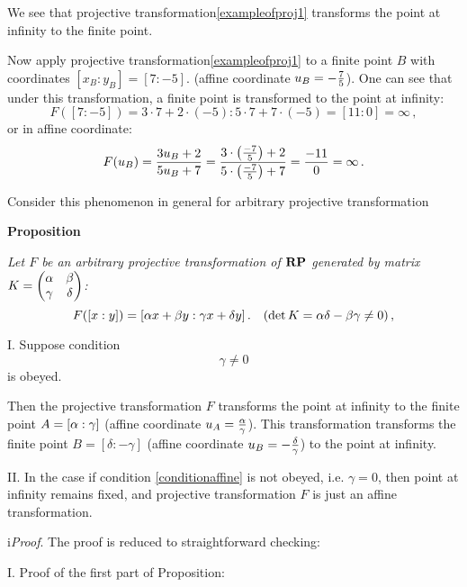 \documentclass[12pt]{article}
\numberwithin{equation}{section}
\begin{document}
We see that projective transformation\eqref{exampleofproj1}
  transforms the point at infinity to the finite point.

  Now apply projective transformation\eqref{exampleofproj1}
to a finite point $B$ with coordinates $[x_B:y_B]=[7:-5]$. 
(affine coordinate $u_B=-{7\over 5}$).
One can see that  under this transformation,
a finite point 
 is transformed
to the point at infinity:
           $$
F([7:-5])= {3\cdot 7+2\cdot (-5):5\cdot 7+7\cdot (-5)}
= [11:0]=\infty\,,      
           $$ 
or in affine coordinate:
           $$
F(u_B)={3u_B+2\over 5u_B+7}=
    {
   3\cdot \left(-7\over 5\right)+2
       \over
 5\cdot \left(-7\over 5\right)+7
              }={-11\over 0}=\infty\,.
           $$


Consider this phenomenon in general for arbitrary
projective transformation


{\bf Proposition}
{
\it Let  $F$ be an arbitrary projective transformation of ${\bf R}{\bf P}$
generated by matrix 
$K=\begin{pmatrix}\alpha &\beta\cr\gamma &\delta\end{pmatrix}$:
            \begin{equation}\label{projtransformarbitrary}
   F([x:y])=[\alpha x+\beta y: \gamma x+\delta y]\,.\quad 
(\det K=\alpha\delta-\beta\gamma\not=0)\,,
            \end{equation}

I. Suppose condition 
            \begin{equation}\label{conditionaffine}
            \gamma\not=0 
             \end{equation}
is obeyed.  

Then the projective transformation
$F$ transforms the point at infinity to the
finite  point $A=[\alpha:\gamma]$
(affine coordinate $u_A={\alpha\over \gamma}$).
  This transformation 
 transforms
the finite point  $B=[\delta:-\gamma]$ 
(affine coordinate $u_B=-{\delta\over \gamma}$) 
to the point at infinity.

II. In the case if condition \eqref{conditionaffine}
is not obeyed, i.e. $\gamma=0$, then
point at infinity remains fixed, and 
projective transformation $F$ is just an affine transformation.
}

\m

{i\sl Proof}.
The proof is reduced to straightforward checking:

I.  Proof of the first part of Proposition:
\end{document}
